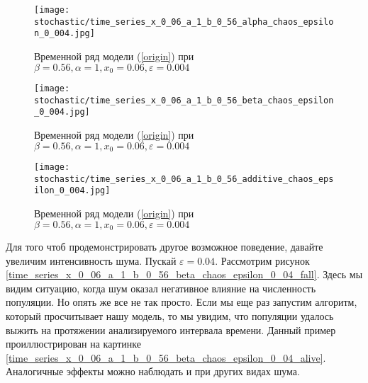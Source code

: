 


        \begin{figure}
            \centering
            \texttt{[image: stochastic/time\_series\_x\_0\_06\_a\_1\_b\_0\_56\_alpha\_chaos\_epsilon\_0\_004.jpg]}
        
            \captionsetup{justification=centering}
            \caption{Временной ряд модели (\ref{origin}) при \(\beta = 0.56, \alpha = 1, x_0 = 0.06, \varepsilon = 0.004\)}
            \label{time_series_x_0_06_a_1_b_0_56_alpha_chaos_epsilon_0_004}
        \end{figure}

        \begin{figure}
            \centering
            \texttt{[image: stochastic/time\_series\_x\_0\_06\_a\_1\_b\_0\_56\_beta\_chaos\_epsilon\_0\_004.jpg]}
        
            \captionsetup{justification=centering}
            \caption{Временной ряд модели (\ref{origin}) при \(\beta = 0.56, \alpha = 1, x_0 = 0.06, \varepsilon = 0.004\)}
            \label{time_series_x_0_06_a_1_b_0_56_beta_chaos_epsilon_0_004}
        \end{figure}

        \begin{figure}
            \centering
            \texttt{[image: stochastic/time\_series\_x\_0\_06\_a\_1\_b\_0\_56\_additive\_chaos\_epsilon\_0\_004.jpg]}
        
            \captionsetup{justification=centering}
            \caption{Временной ряд модели (\ref{origin}) при \(\beta = 0.56, \alpha = 1, x_0 = 0.06, \varepsilon = 0.004\)}
            \label{time_series_x_0_06_a_1_b_0_56_additive_chaos_epsilon_0_004}
        \end{figure}

        Для того чтоб продемонстрировать другое возможное поведение, давайте увеличим интенсивность шума. Пускай \(\varepsilon = 0.04\). Рассмотрим рисунок \ref{time_series_x_0_06_a_1_b_0_56_beta_chaos_epsilon_0_04_fall}. Здесь мы видим ситуацию, когда шум оказал негативное влияние на численность популяции. Но опять же все не так просто. Если мы еще раз запустим алгоритм, который просчитывает нашу модель, то мы увидим, что популяции удалось выжить на протяжении анализируемого интервала времени. Данный пример проиллюстрирован на картинке \ref{time_series_x_0_06_a_1_b_0_56_beta_chaos_epsilon_0_04_alive}. Аналогичные эффекты можно наблюдать и при других видах шума.


